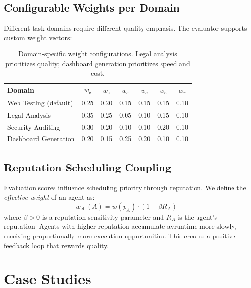 \documentclass[12pt,a4paper]{article}
\theoremstyle{definition}
\theoremstyle{remark}
\begin{document}
\subsection{Configurable Weights per Domain}

Different task domains require different quality emphasis. The evaluator supports custom weight vectors:

\begin{table}[H]
\centering
\begin{tabular}{@{}lcccccc@{}}
\toprule
\textbf{Domain} & $w_q$ & $w_a$ & $w_s$ & $w_c$ & $w_e$ & $w_r$ \\
\midrule
Web Testing (default) & 0.25 & 0.20 & 0.15 & 0.15 & 0.15 & 0.10 \\
Legal Analysis & 0.35 & 0.25 & 0.05 & 0.10 & 0.15 & 0.10 \\
Security Auditing & 0.30 & 0.20 & 0.10 & 0.10 & 0.20 & 0.10 \\
Dashboard Generation & 0.20 & 0.15 & 0.25 & 0.20 & 0.10 & 0.10 \\
\bottomrule
\end{tabular}
\caption{Domain-specific weight configurations. Legal analysis prioritizes quality; dashboard generation prioritizes speed and cost.}\label{tab:domain-weights}
\end{table}

\subsection{Reputation-Scheduling Coupling}

Evaluation scores influence scheduling priority through reputation. We define the \emph{effective weight} of an agent as:
\begin{equation}
  w_{\text{eff}}(A) = w(p_A) \cdot (1 + \beta R_A)
\end{equation}
where $\beta > 0$ is a reputation sensitivity parameter and $R_A$ is the agent's reputation. Agents with higher reputation accumulate avruntime more slowly, receiving proportionally more execution opportunities. This creates a positive feedback loop that rewards quality.

\section{Case Studies}\label{sec:case-studies}
\end{document}
